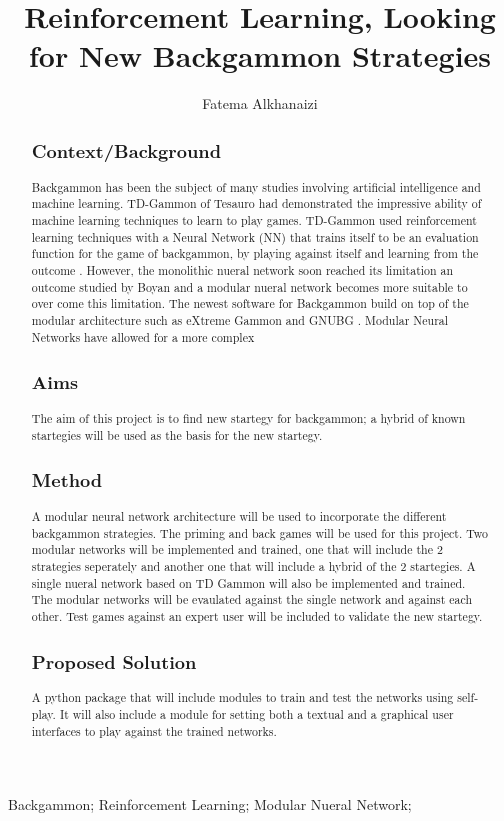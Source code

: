 \documentclass[12pt,a4paper]{article}
\title{Reinforcement Learning, Looking for New Backgammon Strategies}
\author{Fatema Alkhanaizi}
\date{}
\begin{document}
\maketitle

\begin{abstract}
\subsection{Context/Background}
Backgammon has been the subject of many studies involving artificial intelligence and machine learning. TD-Gammon  of Tesauro \cite{} had demonstrated the impressive ability of machine learning techniques to learn to play games. TD-Gammon used reinforcement learning techniques with a Neural Network (NN) that trains itself to be an evaluation function for the game of backgammon, by playing against itself and learning from the outcome \cite{}. However, the monolithic nueral network soon reached its limitation an outcome studied by Boyan \cite{} and a modular nueral network becomes more suitable to over come this limitation. The newest software for Backgammon build on top of the modular architecture such as eXtreme Gammon \cite{} and GNUBG \cite{}. 
Modular Neural Networks have allowed for a more complex 
\subsection{Aims}
The aim of this project is to find new startegy for backgammon; a hybrid of known startegies will be used as the basis for the new startegy. 
\subsection{Method}
A modular neural network architecture will be used to incorporate the different backgammon strategies. The priming and back games will be used for this project. Two modular networks will be implemented and trained, one that will include the 2 strategies seperately and another one that will include a hybrid of the 2 startegies. A single nueral network based on TD Gammon will also be implemented and trained. The modular networks will be evaulated against the single network and against each other. Test games against an expert user will be included to validate the new startegy.
\subsection{Proposed Solution}
A python package that will include modules to train and test the networks using self-play. It will also include a module for setting both a textual and a graphical user interfaces to play against the trained networks. 

\end{abstract}
\begin{keywords}
Backgammon; Reinforcement Learning; Modular Nueral Network; 
\end{keywords}
\end{document}
